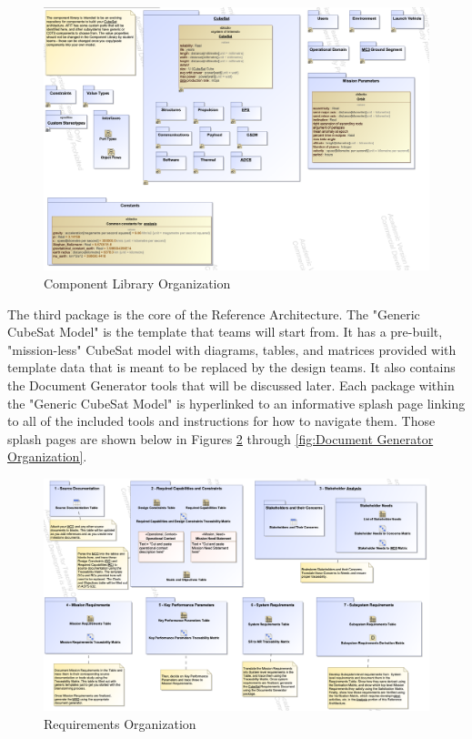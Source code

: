 \documentclass[conference]{joss-pretty}
\begin{document}
\begin{figure}
    \centering
    \includegraphics[width=\textwidth]{Figures/Component Library.png}
    \caption{Component Library Organization}
    \label{fig:Component Library Organization}
\end{figure}

The third package is the core of the Reference Architecture. The "Generic CubeSat Model" is the template that teams will start from. It has a pre-built, "mission-less" CubeSat model with diagrams, tables, and matrices provided with template data that is meant to be replaced by the design teams. It also contains the Document Generator tools that will be discussed later. Each package within the "Generic CubeSat Model" is hyperlinked to an informative splash page linking to all of the included tools and instructions for how to navigate them. Those splash pages are shown below in Figures \ref{fig:Requirements Organization} through \ref{fig:Document Generator Organization}.
\begin{figure}
    \centering
    \includegraphics[width=\textwidth]{Figures/Requirements Organization.png}
    \caption{Requirements Organization}
    \label{fig:Requirements Organization}
\end{figure}
\end{document}
